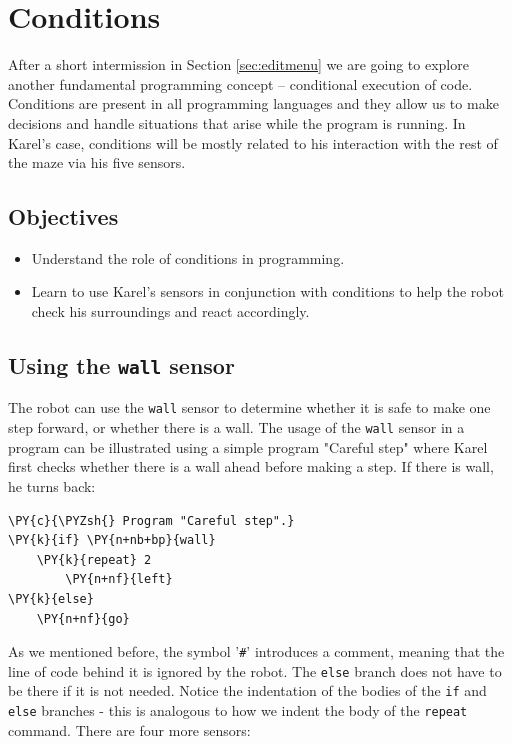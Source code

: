 \section{Conditions} \label{sec:cond}

After a short intermission in Section \ref{sec:editmenu} we are going to explore
another fundamental programming concept -- conditional execution of code. Conditions 
are present in all programming languages and they allow us to make decisions and 
handle situations that arise while the program is running. In Karel's case, conditions 
will be mostly related to his interaction with the rest of the maze via his five sensors.

\subsection{Objectives} 

\begin{itemize}
\item Understand the role of conditions in programming.
\item Learn to use Karel's sensors in conjunction with conditions to help the robot
      check his surroundings and react accordingly. 
\end{itemize}

\subsection{Using the {\tt wall} sensor}

The robot can use the {\tt wall} sensor to determine 
whether it is safe to make one step forward, or whether there is a wall. 
The usage of the {\tt wall} sensor in a program can be illustrated using a simple program "Careful step" 
where Karel first checks whether there is a wall ahead before
making a step. If there is wall, he turns back:\\

\begin{bbox}
\begin{Verbatim}[commandchars=\\\{\}]
\PY{c}{\PYZsh{} Program "Careful step".}
\PY{k}{if} \PY{n+nb+bp}{wall}
    \PY{k}{repeat} 2
        \PY{n+nf}{left}
\PY{k}{else}
    \PY{n+nf}{go}
\end{Verbatim}
\end{bbox}
\vspace{6mm}

\noindent
As we mentioned before, the symbol '{\tt \#}' introduces a comment, meaning that the line 
of code behind it is ignored by the robot.
The {\tt else} branch does not have to be there if it is not needed. Notice the indentation 
of the bodies of the {\tt if} and {\tt else} branches - this is analogous 
to how we indent the body of the {\tt repeat} command. There are four more sensors:\\

